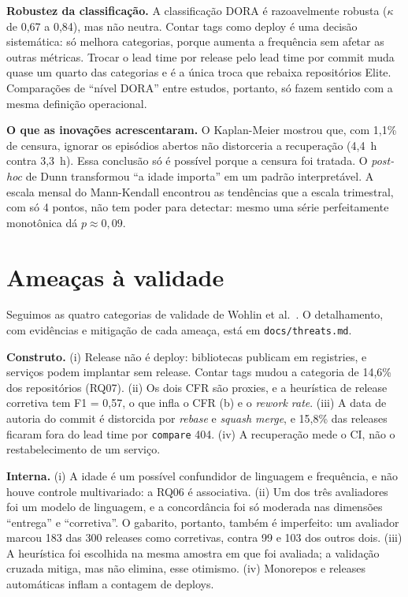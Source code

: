 \documentclass[12pt]{article}
\newcommand{\code}[1]{\texttt{\small #1}}
\begin{document}
\textbf{Robustez da classificação.} A classificação DORA é razoavelmente
robusta ($\kappa$ de 0,67 a 0,84), mas não neutra. Contar tags como deploy é
uma decisão sistemática: só melhora categorias, porque aumenta a frequência
sem afetar as outras métricas. Trocar o lead time por release pelo lead time
por commit muda quase um quarto das categorias e é a única troca que rebaixa
repositórios Elite. Comparações de ``nível DORA'' entre estudos, portanto, só
fazem sentido com a mesma definição operacional.

\textbf{O que as inovações acrescentaram.} O Kaplan-Meier mostrou que, com
1,1\% de censura, ignorar os episódios abertos não distorceria a recuperação
(4,4~h contra 3,3~h). Essa conclusão só é possível porque a censura foi
tratada. O \emph{post-hoc} de Dunn transformou ``a idade importa'' em um
padrão interpretável. A escala mensal do Mann-Kendall encontrou as tendências
que a escala trimestral, com só 4 pontos, não tem poder para detectar: mesmo
uma série perfeitamente monotônica dá $p \approx 0{,}09$.

\section{Ameaças à validade}

Seguimos as quatro categorias de validade de Wohlin et al.\ \cite{wohlin2012}. O detalhamento,
com evidências e mitigação de cada ameaça, está em \code{docs/threats.md}.

\textbf{Construto.} (i) Release não é deploy: bibliotecas publicam em
registries, e serviços podem implantar sem release. Contar tags mudou a
categoria de 14,6\% dos repositórios (RQ07). (ii) Os dois CFR são proxies, e
a heurística de release corretiva tem F1 = 0,57, o que infla o CFR (b) e o
\emph{rework rate}. (iii) A data de autoria do commit é distorcida por
\emph{rebase} e \emph{squash merge}, e 15,8\% das releases ficaram fora do
lead time por \code{compare} 404. (iv) A recuperação mede o CI, não o
restabelecimento de um serviço.

\textbf{Interna.} (i) A idade é um possível confundidor de linguagem e
frequência, e não houve controle multivariado: a RQ06 é associativa. (ii) Um
dos três avaliadores foi um modelo de linguagem, e a concordância foi só
moderada nas dimensões ``entrega'' e ``corretiva''. O gabarito, portanto,
também é imperfeito: um avaliador marcou 183 das 300 releases como
corretivas, contra 99 e 103 dos outros dois. (iii) A heurística foi escolhida
na mesma amostra em que foi avaliada; a validação cruzada mitiga, mas não
elimina, esse otimismo. (iv) Monorepos e releases automáticas inflam a
contagem de deploys.
\end{document}
